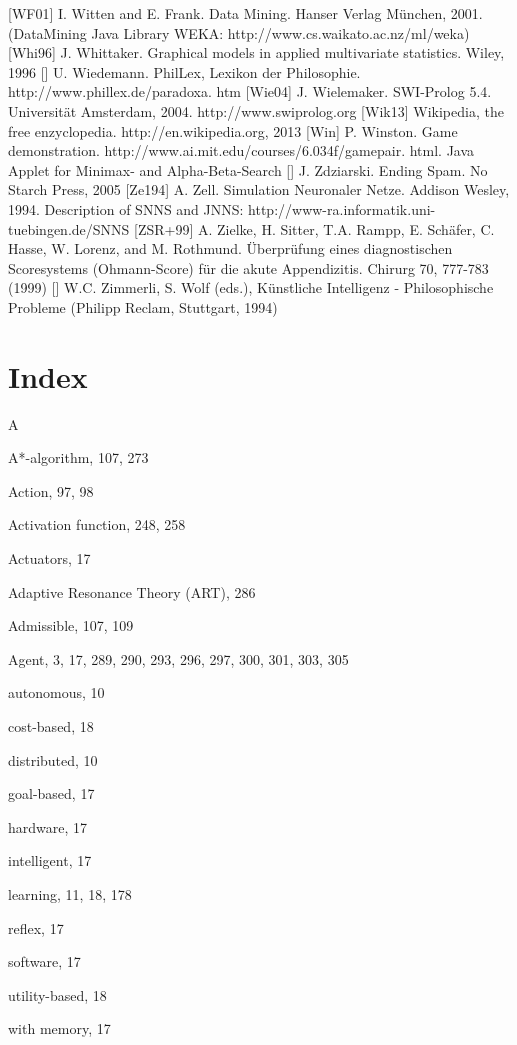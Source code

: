 \documentclass[10pt]{book}
\begin{document}
[WF01] I. Witten and E. Frank. Data Mining. Hanser Verlag München, 2001. (DataMining Java Library WEKA: http://www.cs.waikato.ac.nz/ml/weka)
[Whi96] J. Whittaker. Graphical models in applied multivariate statistics. Wiley, 1996
[\cite{wiedemannphillex}] U. Wiedemann. PhilLex, Lexikon der Philosophie. http://www.phillex.de/paradoxa. htm
[Wie04] J. Wielemaker. SWI-Prolog 5.4. Universität Amsterdam, 2004. http://www.swiprolog.org
[Wik13] Wikipedia, the free enzyclopedia. http://en.wikipedia.org, 2013
[Win] P. Winston. Game demonstration. http://www.ai.mit.edu/courses/6.034f/gamepair. html. Java Applet for Minimax- and Alpha-Beta-Search
[\cite{zdziarski2005ending}] J. Zdziarski. Ending Spam. No Starch Press, 2005
[Ze194] A. Zell. Simulation Neuronaler Netze. Addison Wesley, 1994. Description of SNNS and JNNS: http://www-ra.informatik.uni-tuebingen.de/SNNS
[ZSR+99] A. Zielke, H. Sitter, T.A. Rampp, E. Schäfer, C. Hasse, W. Lorenz, and M. Rothmund. Überprüfung eines diagnostischen Scoresystems (Ohmann-Score) für die akute Appendizitis. Chirurg 70, 777-783 (1999)
[\cite{zimmerli1994ki}] W.C. Zimmerli, S. Wolf (eds.), Künstliche Intelligenz - Philosophische Probleme (Philipp Reclam, Stuttgart, 1994)
\section{Index}

A

A*-algorithm, 107, 273

Action, 97, 98

Activation function, 248, 258

Actuators, 17

Adaptive Resonance Theory (ART), 286

Admissible, 107, 109

Agent, 3, 17, 289, 290, 293, 296, 297, 300, 301, 303, 305

autonomous, 10

cost-based, 18

distributed, 10

goal-based, 17

hardware, 17

intelligent, 17

learning, 11, 18, 178

reflex, 17

software, 17

utility-based, 18

with memory, 17
\end{document}
